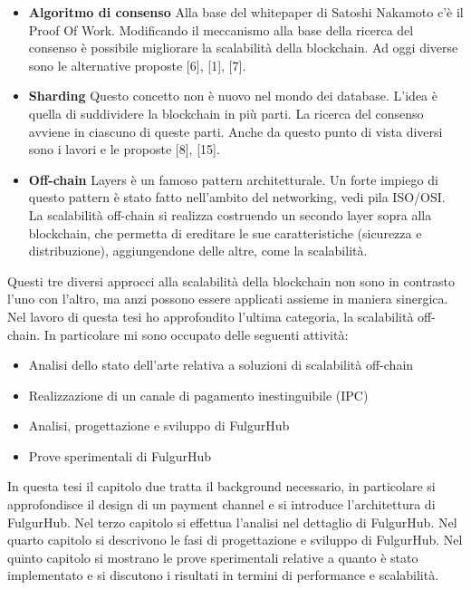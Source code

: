 \documentclass[12pt,italian,]{book}
\providecommand{\tightlist}{%
  \setlength{\itemsep}{0pt}\setlength{\parskip}{0pt}}
\begin{document}
\begin{itemize}
\tightlist
\item
  \textbf{Algoritmo di consenso} Alla base del whitepaper di Satoshi Nakamoto c'è il Proof Of Work. Modificando il meccanismo alla base della ricerca del consenso è possibile migliorare la scalabilità della blockchain. Ad oggi diverse sono le alternative proposte {[}6{]}, {[}1{]}, {[}7{]}.
\item
  \textbf{Sharding} Questo concetto non è nuovo nel mondo dei database. L'idea è quella di suddividere la blockchain in più parti. La ricerca del consenso avviene in ciascuno di queste parti. Anche da questo punto di vista diversi sono i lavori e le proposte {[}8{]}, {[}15{]}.
\item
  \textbf{Off-chain} Layers è un famoso pattern architetturale. Un forte impiego di questo pattern è stato fatto nell'ambito del networking, vedi pila ISO/OSI. La scalabilità off-chain si realizza costruendo un secondo layer sopra alla blockchain, che permetta di ereditare le sue caratteristiche (sicurezza e distribuzione), aggiungendone delle altre, come la scalabilità.
\end{itemize}

Questi tre diversi approcci alla scalabilità della blockchain non sono in contrasto l'uno con l'altro, ma anzi possono essere applicati assieme in maniera sinergica. Nel lavoro di questa tesi ho approfondito l'ultima categoria, la scalabilità off-chain. In particolare mi sono occupato delle seguenti attività:

\begin{itemize}
\tightlist
\item
  Analisi dello stato dell'arte relativa a soluzioni di scalabilità off-chain
\item
  Realizzazione di un canale di pagamento inestinguibile (IPC)
\item
  Analisi, progettazione e sviluppo di FulgurHub
\item
  Prove sperimentali di FulgurHub
\end{itemize}

In questa tesi il capitolo due tratta il background necessario, in particolare si approfondisce il design di un payment channel e si introduce l'architettura di FulgurHub. Nel terzo capitolo si effettua l'analisi nel dettaglio di FulgurHub. Nel quarto capitolo si descrivono le fasi di progettazione e sviluppo di FulgurHub. Nel quinto capitolo si mostrano le prove sperimentali relative a quanto è stato implementato e si discutono i risultati in termini di performance e scalabilità.
\end{document}

